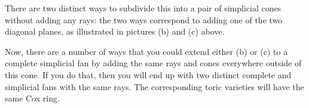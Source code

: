 \documentclass{amsart}
\begin{document}
\begin{example}
\begin{center}
\qquad
{}
\end{center}
There are two distinct ways to subdivide this into a pair of simplicial cones without adding any rays: the two ways correspond to adding one of the two diagonal planes, as illustrated in pictures (b) and (c) above.

Now, there are a number of ways that you could extend either (b) or (c) to a complete simplicial fan by adding the same rays and cones everywhere outside of this cone.  If you do that, then you will end up with two distinct complete and simplicial fans with the same rays.  The corresponding toric varieties will have the same Cox ring.
\end{example}
\end{document}
